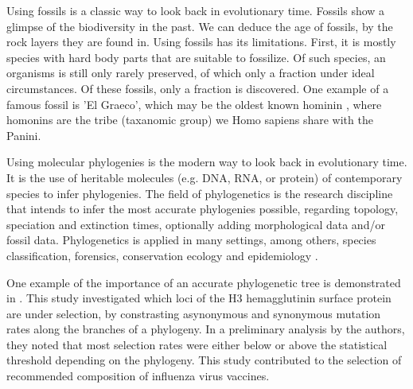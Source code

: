 Using fossils is a classic way to look back in evolutionary time.
Fossils show a glimpse of the biodiversity in the past.
We can deduce the age of fossils, by the rock layers they are found in.
Using fossils has its limitations. First, it is mostly species with hard body
parts that are suitable to fossilize. Of such species, an organisms is still 
only rarely preserved, of which only a fraction under ideal circumstances. Of 
these fossils, only a fraction is discovered.
One example of a famous fossil is 'El Graeco', 
which may be the oldest known hominin \cite{fuss2017potential}, where
homonins are the tribe (taxanomic group) we Homo sapiens share with the Panini.


Using molecular phylogenies is the modern way to look back in evolutionary time.
It is the use of heritable molecules (e.g. DNA, RNA, or protein)  
of contemporary species to infer phylogenies. 
The field of phylogenetics is the research discipline that
intends to infer the most accurate phylogenies possible, 
regarding topology, speciation and extinction times,
optionally adding morphological data and/or fossil data.
Phylogenetics is applied in many settings, among
others, species classification,
forensics, conservation ecology
and epidemiology \cite{lam2010use}.


One example of the importance of an accurate phylogenetic tree 
is demonstrated in \cite{bush1999positive}. This study
investigated which loci of the H3 hemagglutinin surface protein
are under selection, by constrasting asynonymous and synonymous
mutation rates along the branches of a phylogeny. 
In a preliminary analysis by the authors, they noted that
most selection rates were either below or above the 
statistical threshold depending on the phylogeny.
This study contributed to the selection of recommended 
composition of influenza virus vaccines.


